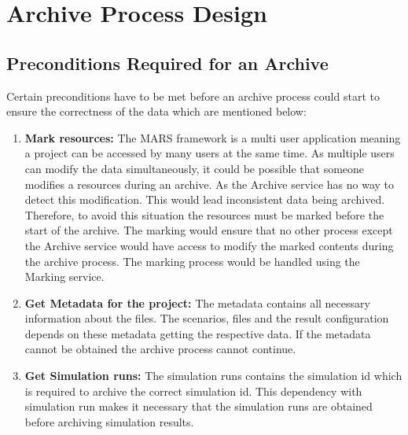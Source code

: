 \section{Archive Process Design}
\subsection{Preconditions Required for an Archive}
Certain preconditions have to be met before an archive process could start to ensure the correctness of the data which are mentioned below:
\begin{enumerate}
    \label{lst:preconditionsArchive}
    \item \textbf{Mark resources:} The MARS framework is a multi user application meaning a project can be accessed by many users at the same time. 
    As multiple users can modify the data simultaneously, it could be possible that someone modifies a resources during an archive. As the 
    Archive service has no way to detect this modification. This would lead inconsistent data being archived.
    Therefore, to avoid this situation the resources must be marked before the start of the archive. The marking would ensure that no other process except the Archive
    service would have access to modify the marked contents during the archive process. The marking process would be handled using the Marking service.
    \item \textbf{Get Metadata for the project:} The metadata contains all necessary information about the files. The scenarios, files and the result 
    configuration depends on these metadata getting 
    the respective data. If the metadata cannot be obtained the archive process cannot continue. 
    \item \textbf{Get Simulation runs:} The simulation runs contains the simulation id which is required to archive the correct simulation id. This dependency
    with simulation run makes it necessary that the simulation runs are obtained before archiving simulation results.
\end{enumerate}

